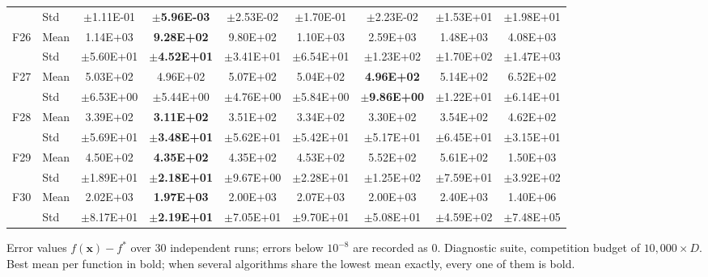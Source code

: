 \begin{table}[htbp]
{\begin{tabular}{clccccccc}
 & Std & $\pm$1.11E-01 & $\pm$\textbf{5.96E-03} & $\pm$2.53E-02 & $\pm$1.70E-01 & $\pm$2.23E-02 & $\pm$1.53E+01 & $\pm$1.98E+01 \\
F26 & Mean & 1.14E+03 & \textbf{9.28E+02} & 9.80E+02 & 1.10E+03 & 2.59E+03 & 1.48E+03 & 4.08E+03 \\
 & Std & $\pm$5.60E+01 & $\pm$\textbf{4.52E+01} & $\pm$3.41E+01 & $\pm$6.54E+01 & $\pm$1.23E+02 & $\pm$1.70E+02 & $\pm$1.47E+03 \\
F27 & Mean & 5.03E+02 & 4.96E+02 & 5.07E+02 & 5.04E+02 & \textbf{4.96E+02} & 5.14E+02 & 6.52E+02 \\
 & Std & $\pm$6.53E+00 & $\pm$5.44E+00 & $\pm$4.76E+00 & $\pm$5.84E+00 & $\pm$\textbf{9.86E+00} & $\pm$1.22E+01 & $\pm$6.14E+01 \\
F28 & Mean & 3.39E+02 & \textbf{3.11E+02} & 3.51E+02 & 3.34E+02 & 3.30E+02 & 3.54E+02 & 4.62E+02 \\
 & Std & $\pm$5.69E+01 & $\pm$\textbf{3.48E+01} & $\pm$5.62E+01 & $\pm$5.42E+01 & $\pm$5.17E+01 & $\pm$6.45E+01 & $\pm$3.15E+01 \\
F29 & Mean & 4.50E+02 & \textbf{4.35E+02} & 4.35E+02 & 4.53E+02 & 5.52E+02 & 5.61E+02 & 1.50E+03 \\
 & Std & $\pm$1.89E+01 & $\pm$\textbf{2.18E+01} & $\pm$9.67E+00 & $\pm$2.28E+01 & $\pm$1.25E+02 & $\pm$7.59E+01 & $\pm$3.92E+02 \\
F30 & Mean & 2.02E+03 & \textbf{1.97E+03} & 2.00E+03 & 2.07E+03 & 2.00E+03 & 2.40E+03 & 1.40E+06 \\
 & Std & $\pm$8.17E+01 & $\pm$\textbf{2.19E+01} & $\pm$7.05E+01 & $\pm$9.70E+01 & $\pm$5.08E+01 & $\pm$4.59E+02 & $\pm$7.48E+05 \\
\bottomrule
\end{tabular}}
\begin{flushleft}\footnotesize
Error values $f(\mathbf{x})-f^{*}$ over 30 independent runs; errors below $10^{-8}$ are recorded as 0. Diagnostic suite, competition budget of $10{,}000\times D$. Best mean per function in bold; when several algorithms share the lowest mean exactly, every one of them is bold.
\end{flushleft}
\end{table}
